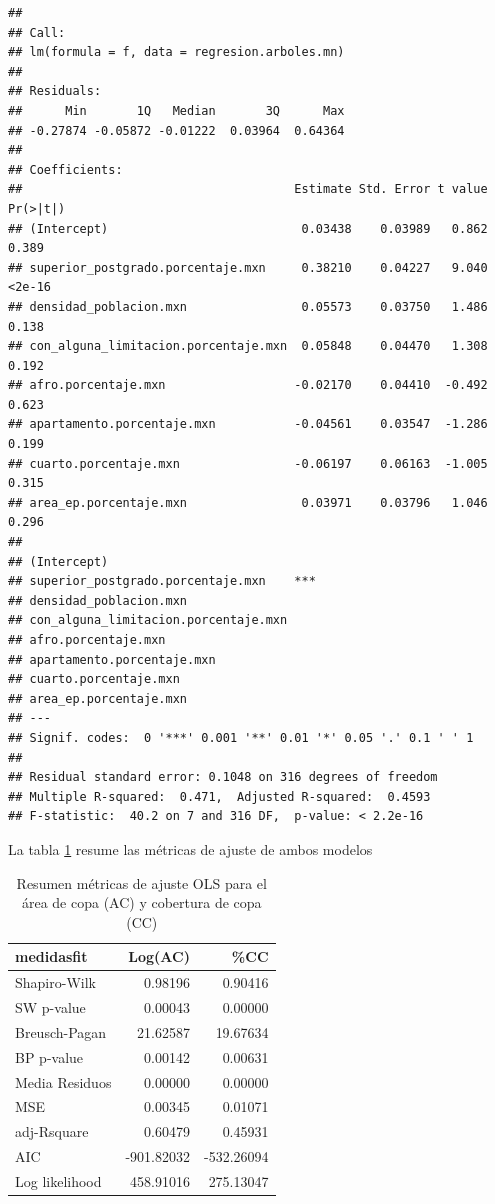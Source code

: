 \documentclass[12pt,]{book}
\begin{document}
\begin{verbatim}
## 
## Call:
## lm(formula = f, data = regresion.arboles.mn)
## 
## Residuals:
##      Min       1Q   Median       3Q      Max 
## -0.27874 -0.05872 -0.01222  0.03964  0.64364 
## 
## Coefficients:
##                                      Estimate Std. Error t value Pr(>|t|)
## (Intercept)                           0.03438    0.03989   0.862    0.389
## superior_postgrado.porcentaje.mxn     0.38210    0.04227   9.040   <2e-16
## densidad_poblacion.mxn                0.05573    0.03750   1.486    0.138
## con_alguna_limitacion.porcentaje.mxn  0.05848    0.04470   1.308    0.192
## afro.porcentaje.mxn                  -0.02170    0.04410  -0.492    0.623
## apartamento.porcentaje.mxn           -0.04561    0.03547  -1.286    0.199
## cuarto.porcentaje.mxn                -0.06197    0.06163  -1.005    0.315
## area_ep.porcentaje.mxn                0.03971    0.03796   1.046    0.296
##                                         
## (Intercept)                             
## superior_postgrado.porcentaje.mxn    ***
## densidad_poblacion.mxn                  
## con_alguna_limitacion.porcentaje.mxn    
## afro.porcentaje.mxn                     
## apartamento.porcentaje.mxn              
## cuarto.porcentaje.mxn                   
## area_ep.porcentaje.mxn                  
## ---
## Signif. codes:  0 '***' 0.001 '**' 0.01 '*' 0.05 '.' 0.1 ' ' 1
## 
## Residual standard error: 0.1048 on 316 degrees of freedom
## Multiple R-squared:  0.471,  Adjusted R-squared:  0.4593 
## F-statistic:  40.2 on 7 and 316 DF,  p-value: < 2.2e-16
\end{verbatim}

La tabla \ref{tab:ajuste-lmcopa-pob-predios} resume las métricas de
ajuste de ambos modelos

\begin{table}

\caption{\label{tab:ajuste-lmcopa-pob-predios}Resumen métricas de ajuste OLS para el área de copa (AC) y cobertura de copa (CC) }
\centering
\begin{tabular}[t]{l|r|r}
\hline
medidasfit & Log(AC) & \%CC\\
\hline
Shapiro-Wilk & 0.98196 & 0.90416\\
\hline
SW p-value & 0.00043 & 0.00000\\
\hline
Breusch-Pagan & 21.62587 & 19.67634\\
\hline
BP p-value & 0.00142 & 0.00631\\
\hline
Media Residuos & 0.00000 & 0.00000\\
\hline
MSE & 0.00345 & 0.01071\\
\hline
adj-Rsquare & 0.60479 & 0.45931\\
\hline
AIC & -901.82032 & -532.26094\\
\hline
Log likelihood & 458.91016 & 275.13047\\
\hline
\end{tabular}
\end{table}
\end{document}
